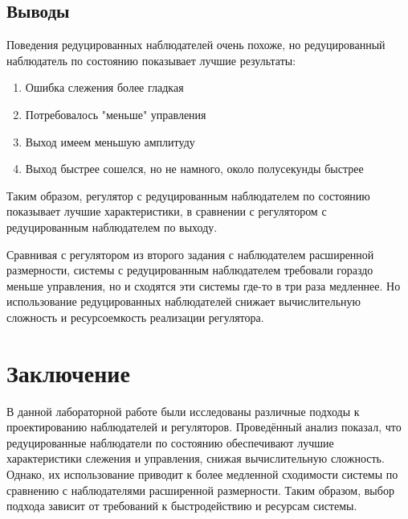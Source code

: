\subsection{Выводы}

Поведения редуцированных наблюдателей очень похоже, но редуцированный наблюдатель по 
состоянию показывает лучшие результаты:
\begin{enumerate}
    \item Ошибка слежения более гладкая
    \item Потребовалось "меньше" управления
    \item Выход имеем меньшую амплитуду
    \item Выход быстрее сошелся, но не намного, около полусекунды быстрее
\end{enumerate}
Таким образом, регулятор с редуцированным наблюдателем по состоянию показывает лучшие характеристики,
в сравнении с регулятором с редуцированным наблюдателем по выходу.

Сравнивая с регулятором из второго задания с наблюдателем расширенной размерности,
системы с редуцированным наблюдателем требовали гораздо меньше управления,
но и сходятся эти системы где-то в три раза медленнее.
Но использование редуцированных наблюдателей снижает вычислительную 
сложность и ресурсоемкость реализации регулятора.


\section{Заключение}

В данной лабораторной работе были исследованы различные подходы к проектированию 
наблюдателей и регуляторов. Проведённый анализ показал, что редуцированные наблюдатели 
по состоянию обеспечивают лучшие характеристики слежения и управления, снижая 
вычислительную сложность. Однако, их использование приводит к более медленной 
сходимости системы по сравнению с наблюдателями расширенной размерности. Таким образом, 
выбор подхода зависит от требований к быстродействию и ресурсам системы.
